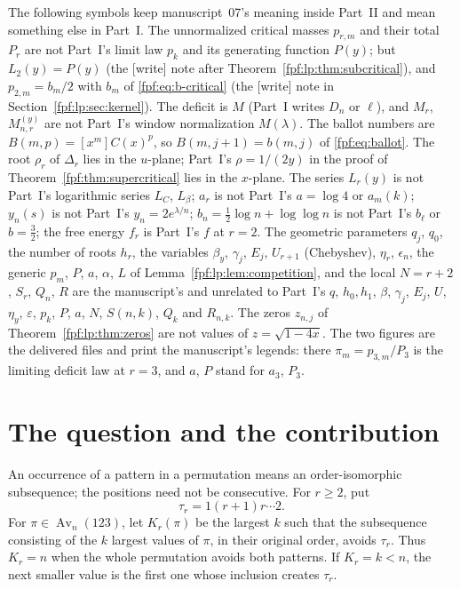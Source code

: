 \documentclass[11pt]{article}
\numberwithin{equation}{section}
\theoremstyle{definition}
\newcommand{\Av}{\operatorname{Av}}
\begin{document}
The following symbols keep manuscript~07's meaning inside Part~II and mean
something else in Part~I. The unnormalized critical masses $p_{r,m}$ and
their total $P_r$ are not Part~I's limit law $p_k$ and its generating
function $P(y)$; but $L_2(y)=P(y)$ (the \textsf{[write]} note after
Theorem~\ref{fpf:lp:thm:subcritical}), and $p_{2,m}=b_m/2$ with $b_m$ of
\eqref{fpf:eq:b-critical} (the \textsf{[write]} note in
Section~\ref{fpf:lp:sec:kernel}). The deficit is $M$ (Part~I writes $D_n$
or $\ell$), and $M_r$, $M_{n,r}^{(y)}$ are not Part~I's window
normalization $M(\lambda)$. The ballot numbers are $B(m,p)=[x^m]C(x)^p$,
so $B(m,j+1)=b(m,j)$ of \eqref{fpf:eq:ballot}. The root $\rho_r$ of
$\Delta_r$ lies in the $u$-plane; Part~I's $\rho=1/(2y)$ in the proof of
Theorem~\ref{fpf:thm:supercritical} lies in the $x$-plane. The series
$L_r(y)$ is not Part~I's logarithmic series $L_C$, $L_\beta$; $a_r$ is not
Part~I's $a=\log4$ or $a_m(k)$; $y_n(s)$ is not Part~I's $y_n=2e^{\lambda/n}$;
$b_n=\frac12\log n+\log\log n$ is not Part~I's $b_\ell$ or $b=\frac32$; the
free energy $f_r$ is Part~I's $f$ at $r=2$. The geometric parameters $q_j$,
$q_0$, the number of roots $h_r$, the variables $\beta_y$, $\gamma_j$,
$E_j$, $U_{r+1}$ (Chebyshev), $\eta_r$, $\epsilon_n$, the generic $p_m$,
$P$, $a$, $\alpha$, $L$ of Lemma~\ref{fpf:lp:lem:competition}, and the
local $N=r+2$, $S_r$, $Q_n$, $R$ are the manuscript's and unrelated to
Part~I's $q$, $h_0,h_1$, $\beta$, $\gamma_j$, $E_j$, $U$, $\eta_y$,
$\varepsilon$, $p_k$, $P$, $a$, $N$, $S(n,k)$, $Q_k$ and $R_{n,k}$.
The zeros $z_{n,j}$ of Theorem~\ref{fpf:lp:thm:zeros} are not values of
$z=\sqrt{1-4x}$. The two figures are the delivered files and print the
manuscript's legends: there $\pi_m=p_{3,m}/P_3$ is the limiting deficit law
at $r=3$, and $a$, $P$ stand for $a_3$, $P_3$.

\section{The question and the contribution}
\label{fpf:lp:sec:question}

An occurrence of a pattern in a permutation means an order-isomorphic
subsequence; the positions need not be consecutive. For \(r\ge2\), put
\[
 \tau_r=1(r+1)r\cdots2.
\]
For \(\pi\in\Av_n(123)\), let \(K_r(\pi)\) be the largest \(k\) such
that the subsequence consisting of the \(k\) largest values of \(\pi\),
in their original order, avoids \(\tau_r\). Thus \(K_r=n\) when the
whole permutation avoids both patterns. If \(K_r=k<n\), the next smaller
value is the first one whose inclusion creates \(\tau_r\).
\end{document}
